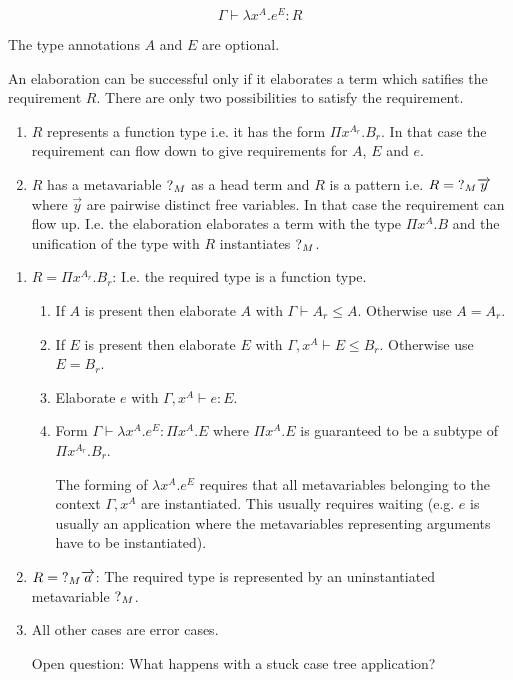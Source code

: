 $$
\Gamma \vdash \lambda x^A. e^E : R
$$

The type annotations $A$ and $E$ are optional.

An elaboration can be successful only if it elaborates a term which satifies the
requirement $R$. There are only two possibilities to satisfy the requirement.

\begin{enumerate}
    \item $R$ represents a function type i.e. it has the form $\Pi x^{A_r}.
        B_r$. In that case the requirement can flow down to give requirements
        for $A$, $E$ and $e$.

    \item $R$ has a metavariable ${?_{M}}$ as a head term and $R$ is a pattern
        i.e. $R = {?_{M}} {\overrightarrow {y}}$ where $\vec y$ are pairwise distinct free
        variables. In that case the requirement can flow up. I.e. the
        elaboration elaborates a term with the type $\Pi x^A. B$ and the
        unification of the type with $R$ instantiates ${?_{M}}$.
\end{enumerate}


\begin{enumerate}
    \item $R = \Pi x^{A_r}. B_r$: I.e. the required type is a function type.

        \begin{enumerate}
            \item If $A$ is present then elaborate $A$ with $\Gamma \vdash A_r
                \le A$. Otherwise use $A = A_r$.

            \item If $E$ is present then elaborate $E$
                with $\Gamma, x^A \vdash E \le B_r$. Otherwise use $E = B_r$.

            \item Elaborate $e$ with $\Gamma, x^A \vdash e: E$.

            \item Form $\Gamma \vdash \lambda x^A. e^E : \Pi x^A. E$ where $\Pi
                x^A. E$ is guaranteed to be a subtype of $\Pi x^{A_r}. B_r$.

                The forming of $\lambda x^A. e^E$ requires that all
                metavariables belonging to the context $\Gamma, x^A$ are
                instantiated. This usually requires waiting (e.g. $e$ is usually
                an application where the metavariables representing arguments
                have to be instantiated).
        \end{enumerate}

    \item $R = {?_{M}} {\overrightarrow {a}}$: The required type is represented by an
        uninstantiated metavariable ${?_{M}}$.

    \item All other cases are error cases.

        Open question: What happens with a stuck case tree application?
\end{enumerate}





